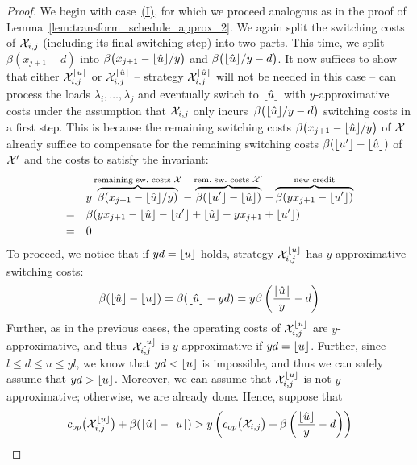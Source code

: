\begin{proof}
\vspace{-\baselineskip}We begin with case~\hyperref[itm:schedule_behavior_down_up_y_subcases_I]{(I)}, for which we proceed analogous as in the proof of Lemma~\ref{lem:transform_schedule_approx_2}. We again split the switching costs of $\mathcal{X}_{i,j}$ (including its final switching step) into two parts. This time, we split $\beta(x_{j+1}-d)$ into $\beta\bigl(x_{j+1}-\lfloor\hat{u}\rfloor/y\bigr)$ and $\beta\bigl(\lfloor\hat{u}\rfloor/y-d\bigr)$. It now suffices to show that either $\mathcal{X}_{i,j}^{\lfloor u\rfloor}$ or $\mathcal{X}_{i,j}^{\lfloor\hat{u}\rfloor}$ -- strategy $\mathcal{X}_{i,j}^{\lceil\hat{u}\rceil}$ will not be needed in this case -- can process the loads $\lambda_i,\dotsc,\lambda_j$ and eventually switch to $\lfloor\hat{u}\rfloor$ with $y$-approximative costs under the assumption that $\mathcal{X}_{i,j}$ only incurs~$\beta\bigl(\lfloor\hat{u}\rfloor/y-d\bigr)$ switching costs in a first step.
This is because the remaining switching costs $\beta\bigl(x_{j+1}-\lfloor\hat{u}\rfloor/y\bigr)$ of $\mathcal{X}$ already suffice to compensate for the remaining switching costs $\beta(\lfloor u'\rfloor-\lfloor\hat{u}\rfloor)$ of $\mathcal{X}'$ and the costs to satisfy the invariant:
\begin{align*}
	&y\overbrace{\beta(x_{j+1}-\floor{\hat{u}}/y)}^{\text{remaining sw.\ costs }\mx}-\overbrace{\beta(\floor{u'}-\floor{\hat{u}})}^{\text{rem.\ sw.\ costs }\mx'}-\overbrace{\beta(yx_{j+1}-\floor{u'})}^{\text{new credit}}\\
	=\quad&\beta(yx_{j+1}-\floor{\hat{u}}-\floor{u'}+\floor{\hat{u}}-yx_{j+1}+\floor{u'})\\
	=\quad&0
\end{align*}
To proceed, we notice that if $yd=\lfloor u\rfloor$ holds, strategy $\mathcal{X}_{i,j}^{\lfloor u\rfloor}$ has $y$-approximative switching costs:
\begin{equation*}
	\beta(\lfloor\hat{u}\rfloor-\lfloor u\rfloor)=\beta(\lfloor\hat{u}\rfloor-yd)=y\beta\left(\frac{\lfloor\hat{u}\rfloor}{y}-d\right)
\end{equation*}
Further, as in the previous cases, the operating costs of $\mathcal{X}_{i,j}^{\lfloor u\rfloor}$ are $y$-approximative, and thus~$\mathcal{X}_{i,j}^{\lfloor u\rfloor}$ is $y$-approximative if $yd=\lfloor u\rfloor$. Further, since $l\le d\le u\le yl$, we know that $yd<\lfloor u\rfloor$ is impossible, and thus we can safely assume that $yd>\lfloor u\rfloor$. Moreover, we can assume that $\mathcal{X}_{i,j}^{\lfloor u\rfloor}$ is not $y$-approximative; otherwise, we are already done. Hence, suppose that 
\begin{equation*}
	\opcosts\bigl(\mx_{i,j}^{\floor{u}}\bigr)+\beta(\floor{\hat{u}}-\floor{u})>y\left(\opcosts\bigl(\mx_{i,j}\bigr)+\beta\left(\frac{\floor{\hat{u}}}{y}-d\right)\right)

\end{equation*}
\end{proof}
